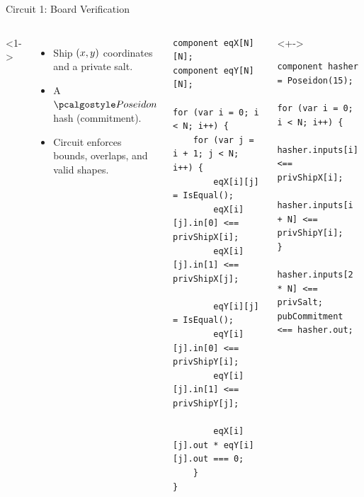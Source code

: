 \begin{frame}[fragile]{Circuit 1: Board Verification}
    \begin{columns}<1->
        \begin{itemize}
            \item {} Ship $\left(x, y\right)$ coordinates and a private salt.
            \item {} A $\poseidon$ hash (commitment).
            \item Circuit enforces bounds, overlaps, and valid shapes.
        \end{itemize}
        \begin{verbatim}
component eqX[N][N];
component eqY[N][N];

for (var i = 0; i < N; i++) {
    for (var j = i + 1; j < N; i++) {
        eqX[i][j] = IsEqual();
        eqX[i][j].in[0] <== privShipX[i];
        eqX[i][j].in[1] <== privShipX[j];
        
        eqY[i][j] = IsEqual();
        eqY[i][j].in[0] <== privShipY[i];
        eqY[i][j].in[1] <== privShipY[j];
        
        eqX[i][j].out * eqY[i][j].out === 0;
    }
}
        \end{verbatim}
        \vspace{-1em}
        \begin{uncoverenv}<+->
            \begin{verbatim}
component hasher = Poseidon(15);

for (var i = 0; i < N; i++) {
    hasher.inputs[i] <== privShipX[i];
    hasher.inputs[i + N] <== privShipY[i];
}

hasher.inputs[2 * N] <== privSalt;
pubCommitment <== hasher.out;
            \end{verbatim}
        \end{uncoverenv}
    \end{columns}
\end{frame}

